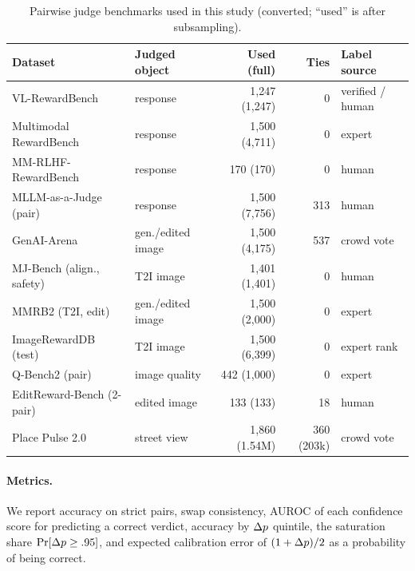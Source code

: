 \begin{table}[t]
\centering\small
\caption{Pairwise judge benchmarks used in this study (converted; ``used'' is after subsampling).}\label{tab:data}
\begin{tabular}{llrrl}
\toprule
Dataset & Judged object & Used (full) & Ties & Label source\\
\midrule
VL-RewardBench \citep{li2024vlrewardbench} & response & 1{,}247 (1{,}247) & 0 & verified / human\\
Multimodal RewardBench \citep{yasunaga2025multimodal} & response & 1{,}500 (4{,}711) & 0 & expert\\
MM-RLHF-RewardBench & response & 170 (170) & 0 & human\\
MLLM-as-a-Judge (pair) \citep{chen2024mllmasajudge} & response & 1{,}500 (7{,}756) & 313 & human\\
GenAI-Arena \citep{jiang2024genai} & gen./edited image & 1{,}500 (4{,}175) & 537 & crowd vote\\
MJ-Bench (align., safety) \citep{chen2024mjbench} & T2I image & 1{,}401 (1{,}401) & 0 & human\\
MMRB2 (T2I, edit) \citep{hu2025multimodal} & gen./edited image & 1{,}500 (2{,}000) & 0 & expert\\
ImageRewardDB (test) & T2I image & 1{,}500 (6{,}399) & 0 & expert rank\\
Q-Bench2 (pair) & image quality & 442 (1{,}000) & 0 & expert\\
EditReward-Bench (2-pair) & edited image & 133 (133) & 18 & human\\
Place Pulse 2.0 \citep{dubey2016deep} & street view & 1{,}860 (1.54M) & 360 (203k) & crowd vote\\
\bottomrule
\end{tabular}
\end{table}

\paragraph{Metrics.}
We report accuracy on strict pairs, swap consistency, AUROC of each confidence score for predicting a correct verdict, accuracy by $\dpconf$ quintile, the saturation share $\Pr[\Delta p\ge .95]$, and expected calibration error of $(1+\dpconf)/2$ as a probability of being correct.

\begin{table}[t]
\centering\small
\caption{Diagnostic results for Qwen3-VL-8B (Qwen3.5-9B and Qwen2.5-VL-7B in \cref{app:more}). $n$: strict pairs. Q1/Q5: accuracy in the lowest/highest $\dpconf$ quintile. Sat.: share of pairs with $\dpconf\ge.95$. ECE: of $(1+\dpconf)/2$ read as the probability of a correct verdict.}\label{tab:diag}

\end{table}

